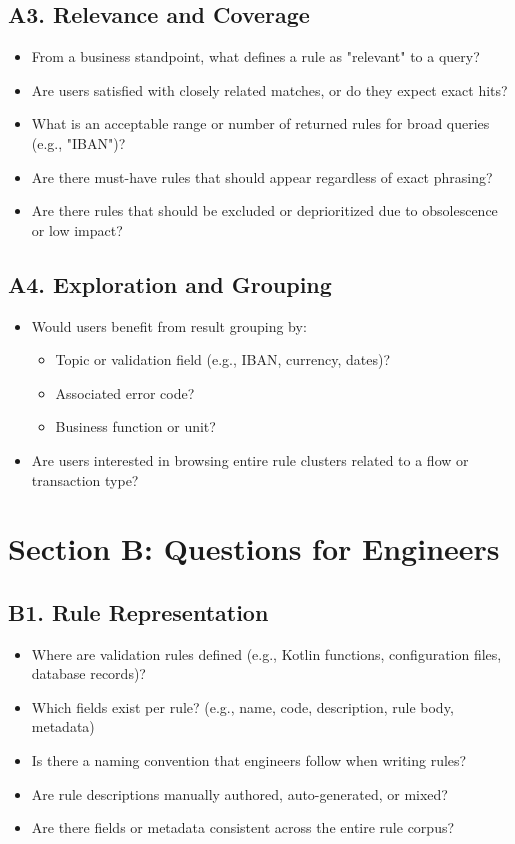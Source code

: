 \subsection{A3. Relevance and Coverage}
\begin{itemize}
  \item From a business standpoint, what defines a rule as "relevant" to a query?
  \item Are users satisfied with closely related matches, or do they expect exact hits?
  \item What is an acceptable range or number of returned rules for broad queries (e.g., "IBAN")?
  \item Are there must-have rules that should appear regardless of exact phrasing?
  \item Are there rules that should be excluded or deprioritized due to obsolescence or low impact?
\end{itemize}

\subsection{A4. Exploration and Grouping}
\begin{itemize}
  \item Would users benefit from result grouping by:
  \begin{itemize}
    \item Topic or validation field (e.g., IBAN, currency, dates)?
    \item Associated error code?
    \item Business function or unit?
  \end{itemize}
  \item Are users interested in browsing entire rule clusters related to a flow or transaction type?
\end{itemize}

\section{Section B: Questions for Engineers}
\subsection{B1. Rule Representation}
\begin{itemize}
  \item Where are validation rules defined (e.g., Kotlin functions, configuration files, database records)?
  \item Which fields exist per rule? (e.g., name, code, description, rule body, metadata)
  \item Is there a naming convention that engineers follow when writing rules?
  \item Are rule descriptions manually authored, auto-generated, or mixed?
  \item Are there fields or metadata consistent across the entire rule corpus?
\end{itemize}

